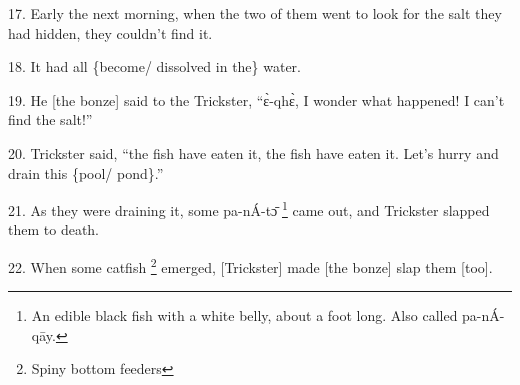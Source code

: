 17. Early the next morning, when the two of them went to look for the salt they
had hidden, they couldn't find it.

18. It had all \{become/ dissolved in the\} water.

19. He [the bonze] said to the Trickster, ``ɛ̀-qhɛ̀, I wonder what happened!
I can't find the salt!''

20. Trickster said, ``the fish have eaten it, the fish have eaten it. Let's hurry
and drain this \{pool/ pond\}.''

21. As they were draining it, some pa-nÁ-tɔ̄ \footnote{An edible black fish with a white belly, about a foot long. Also called pa-nÁ-qāy.} came out, and Trickster slapped
them to death.

22. When some catfish \footnote{Spiny bottom feeders} emerged, [Trickster] made [the bonze] slap them [too].
